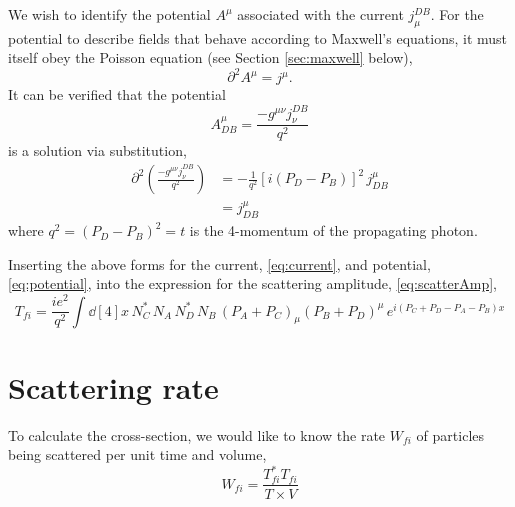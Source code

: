 We wish to identify the potential $A^\mu$ associated with the current $j_\mu^{DB}$. For the potential to describe fields that behave according to Maxwell's equations, it must itself obey the Poisson equation (see Section \ref{sec:maxwell} below),
\begin{equation}
\partial^2 A^\mu = j^\mu.
\end{equation}
It can be verified that the potential
\begin{equation}
A_{DB}^\mu = \frac{- g^{\mu\nu} j^{DB}_\nu}{q^2} \label{eq:potential}
\end{equation}
is a solution via substitution,
\begin{align}
\partial^2 \left( \frac{-g^{\mu\nu} j^{DB}_\nu}{q^2} \right) &= -\frac{1}{q^2} \left[ i(P_D - P_B) \right]^2 \, j_{DB}^\mu \nonumber \\
&= j_{DB}^\mu
\end{align}
where $q^2 = (P_D - P_B)^2 = t$ is the 4-momentum of the propagating photon.

Inserting the above forms for the current, \eqref{eq:current}, and potential, \eqref{eq:potential}, into the expression for the scattering amplitude, \eqref{eq:scatterAmp},
\begin{equation}
T_{fi} = \frac{ie^2}{q^2} \int \dd[4]{x} \, N_C^* \, N_A \, N_D^* \, N_B \, (P_A + P_C)_\mu (P_B + P_D)^\mu \, e^{i(P_C+P_D-P_A-P_B)x}
\end{equation}

\section{Scattering rate}
To calculate the cross-section, we would like to know the rate $W_{fi}$ of particles being scattered per unit time and volume,
\begin{equation}\boxed{
W_{fi} = \frac{T_{fi}^* T_{fi}}{T \times V}
}\end{equation}


